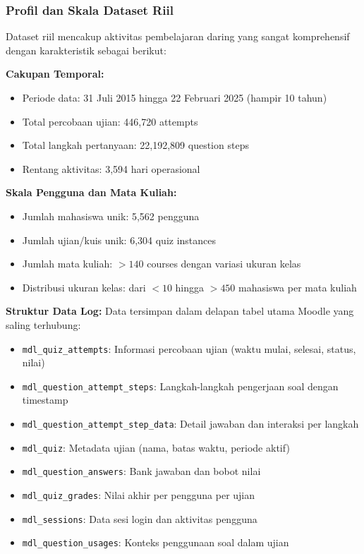 \subsubsection{Profil dan Skala Dataset Riil}
\label{sec:profilDatasetRiil}

Dataset riil mencakup aktivitas pembelajaran daring yang sangat komprehensif dengan karakteristik sebagai berikut:

\textbf{Cakupan Temporal:}
\begin{itemize}
    \item Periode data: 31 Juli 2015 hingga 22 Februari 2025 (hampir 10 tahun)
    \item Total percobaan ujian: 446,720 attempts
    \item Total langkah pertanyaan: 22,192,809 question steps
    \item Rentang aktivitas: 3,594 hari operasional
\end{itemize}

\textbf{Skala Pengguna dan Mata Kuliah:}
\begin{itemize}
    \item Jumlah mahasiswa unik: 5,562 pengguna
    \item Jumlah ujian/kuis unik: 6,304 quiz instances
    \item Jumlah mata kuliah: $>140$ courses dengan variasi ukuran kelas
    \item Distribusi ukuran kelas: dari $<10$ hingga $>450$ mahasiswa per mata kuliah
\end{itemize}

\textbf{Struktur Data Log:}
Data tersimpan dalam delapan tabel utama Moodle yang saling terhubung:
\begin{itemize}
    \item \texttt{mdl\_quiz\_attempts}: Informasi percobaan ujian (waktu mulai, selesai, status, nilai)
    \item \texttt{mdl\_question\_attempt\_steps}: Langkah-langkah pengerjaan soal dengan timestamp
    \item \texttt{mdl\_question\_attempt\_step\_data}: Detail jawaban dan interaksi per langkah
    \item \texttt{mdl\_quiz}: Metadata ujian (nama, batas waktu, periode aktif)
    \item \texttt{mdl\_question\_answers}: Bank jawaban dan bobot nilai
    \item \texttt{mdl\_quiz\_grades}: Nilai akhir per pengguna per ujian
    \item \texttt{mdl\_sessions}: Data sesi login dan aktivitas pengguna
    \item \texttt{mdl\_question\_usages}: Konteks penggunaan soal dalam ujian
\end{itemize}

